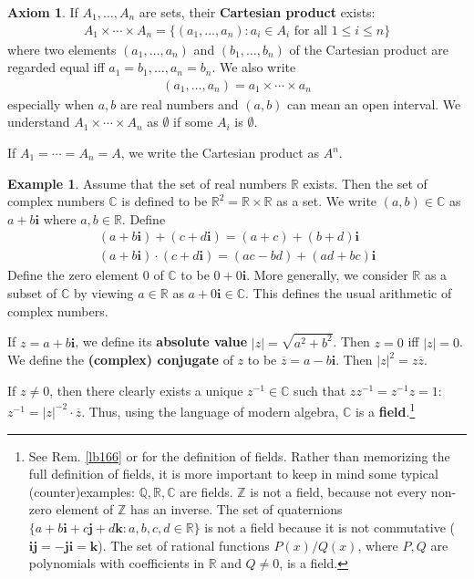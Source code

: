 \documentclass[12pt,b5paper,notitlepage]{article}
\theoremstyle{definition}
\newtheorem{eg}[df]{Example}
\newtheorem*{axiom}{Axiom}
\theoremstyle{plain}
\newcommand{\ovl}{\overline}
\newcommand{\im}{\mathbf{i}}
\newcommand{\Cbb}{\mathbb C}
\newcommand{\Zbb}{\mathbb Z}
\newcommand{\Qbb}{\mathbb Q}
\newcommand{\Rbb}{\mathbb R}
\numberwithin{equation}{section}
\begin{document}
\begin{axiom}
If $A_1,\dots,A_n$ are sets, their \textbf{Cartesian product} exists:
\begin{align*}
A_1\times\cdots\times A_n=\{(a_1,\dots,a_n): a_i\in A_i\text{ for all }1\leq i\leq n\}
\end{align*}
where two elements $(a_1,\dots,a_n)$ and $(b_1,\dots,b_n)$ of the Cartesian product are regarded equal iff $a_1=b_1,\dots,a_n=b_n$. We also write
\begin{align*}
(a_1,\dots,a_n)=a_1\times\cdots\times a_n
\end{align*}
especially when $a,b$ are real numbers and $(a,b)$ can mean an open interval. We understand $A_1\times\cdots\times A_n$ as $\emptyset$ if some $A_i$ is $\emptyset$.

If $A_1=\cdots=A_n=A$, we write the Cartesian product as $A^n$. \hfill\qedsymbol
\end{axiom}

\begin{eg}
Assume that the set of real numbers $\Rbb$ exists. Then the set of complex numbers $\Cbb$ \index{C@$\Cbb$, the set of complex numbers} is defined to be $\Rbb^2=\Rbb\times\Rbb$ as a set. We write $(a,b)\in\Cbb$ as $a+b\im$ where $a,b\in\Rbb$. Define
\begin{gather*}
(a+b\im)+(c+d\im)=(a+c)+(b+d)\im\\
(a+b\im)\cdot (c+d\im)=(ac-bd)+(ad+bc)\im
\end{gather*}
Define the zero element $0$ of $\Cbb$ to be $0+0\im$. More generally, we consider $\Rbb$ as a subset of $\Cbb$ by viewing $a\in\Rbb$ as $a+0\im\in\Cbb$. This defines the usual arithmetic of complex numbers. 

If $z=a+b\im$, we define its \textbf{absolute value} $|z|=\sqrt{a^2+b^2}$. Then $z=0$ iff $|z|=0$. We define the \textbf{(complex) conjugate} of $z$ to be $\ovl z=a-b\im$. Then $|z|^2=z\ovl z$.

If $z\neq 0$, then there clearly exists a unique $z^{-1}\in\Cbb$ such that $zz^{-1}=z^{-1}z=1$:  $z^{-1}=|z|^{-2}\cdot \ovl z$. Thus, using the language of modern algebra, $\Cbb$ is a  \textbf{field}.\footnote{See Rem. \ref{lb166} or  \cite[Def. 1.12]{Rud-P} for the definition of fields. Rather than memorizing the full definition of fields, it is more important to keep in mind some typical (counter)examples: $\Qbb,\Rbb,\Cbb$ are fields. $\Zbb$ is not a field, because not every non-zero element of $\Zbb$ has an inverse. The set of quaternions $\{a+b\im+c\mathbf{j}+d\mathbf{k}: a,b,c,d\in\Rbb\}$ is not a field because it is not commutative ($\im\mathbf{j}=-\mathbf{j}\im=\mathbf{k}$). The set of rational functions $P(x)/Q(x)$, where $P,Q$ are polynomials with coefficients in $\Rbb$ and $Q\neq 0$, is a field.}  \hfill\qedsymbol
\end{eg}
\end{document}
